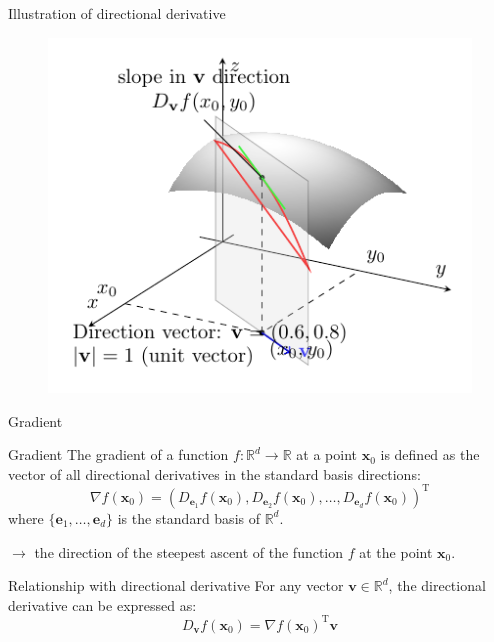 \documentclass[aspectratio=1610]{beamer}
\begin{document}
\begin{frame}{Illustration of directional derivative}

  \begin{figure}[h]
    \centering
    \includegraphics[height=\textheight]{figures/directional_derivative.pdf}
  \end{figure}

\end{frame}


\begin{frame}{Gradient}

  \begin{block}{Gradient}
    The gradient of a function $f:\mathbb{R}^d \to \mathbb{R}$ at a point $\mathbf{x}_0$ is defined as the vector of all directional derivatives in the standard basis directions:
    $$\nabla f(\mathbf{x}_0) = \left( D_{\mathbf{e}_1}f(\mathbf{x}_0), D_{\mathbf{e}_2}f(\mathbf{x}_0), \ldots, D_{\mathbf{e}_d}f(\mathbf{x}_0) \right)^\mathrm{T}$$
    where $\{\mathbf{e}_1, \ldots, \mathbf{e}_d\}$ is the standard basis of $\mathbb{R}^d$.
  \end{block}

  $\rightarrow$ the direction of the steepest ascent of the function $f$ at the point $\mathbf{x}_0$.

  \begin{block}{Relationship with directional derivative}
    For any vector $\mathbf{v} \in \mathbb{R}^d$, the directional derivative can be expressed as:
    $$D_{\mathbf{v}}f(\mathbf{x}_0) = \nabla f(\mathbf{x}_0)^\mathrm{T} \mathbf{v}$$
  \end{block}

\end{frame}
    
\end{document}
